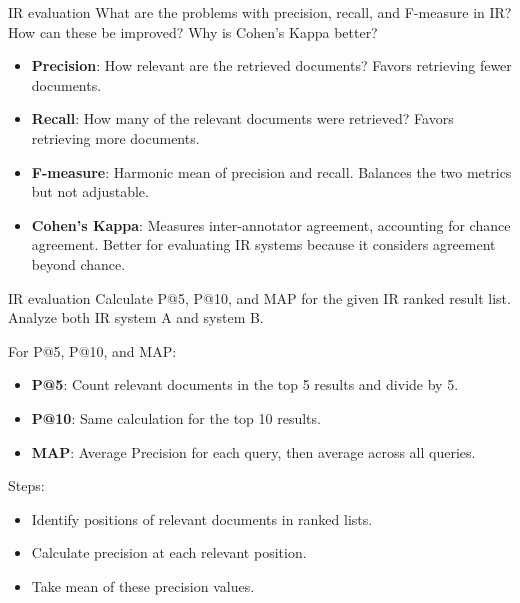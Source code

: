 \documentclass{article}
\begin{document}
\begin{exercise}{IR evaluation}
  What are the problems with precision, recall, and F-measure in IR? How can these be improved? Why is Cohen's Kappa better?

  \begin{solution}
    \begin{itemize}
        \item \textbf{Precision}: How relevant are the retrieved documents? Favors retrieving fewer documents.
        \item \textbf{Recall}: How many of the relevant documents were retrieved? Favors retrieving more documents.
        \item \textbf{F-measure}: Harmonic mean of precision and recall. Balances the two metrics but not adjustable.
        \item \textbf{Cohen's Kappa}: Measures inter-annotator agreement, accounting for chance agreement. Better for evaluating IR systems because it considers agreement beyond chance.
    \end{itemize}
  \end{solution}
\end{exercise}

\begin{exercise}{IR evaluation}
  Calculate P@5, P@10, and MAP for the given IR ranked result list. Analyze both IR system A and system B.

  \begin{solution}
    For P@5, P@10, and MAP:
    \begin{itemize}
        \item \textbf{P@5}: Count relevant documents in the top 5 results and divide by 5.
        \item \textbf{P@10}: Same calculation for the top 10 results.
        \item \textbf{MAP}: Average Precision for each query, then average across all queries.
    \end{itemize}
    Steps:
    \begin{itemize}
        \item Identify positions of relevant documents in ranked lists.
        \item Calculate precision at each relevant position.
        \item Take mean of these precision values.
    \end{itemize}
  \end{solution}
\end{exercise}
\end{document}
